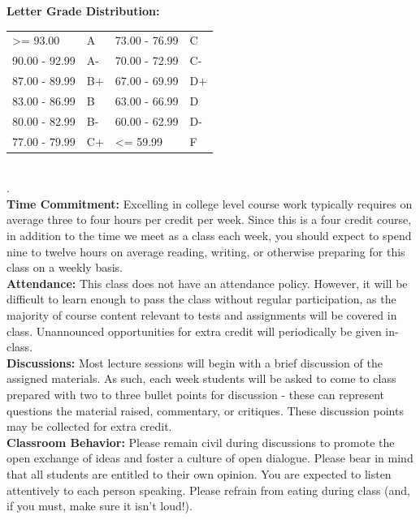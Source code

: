 \documentclass[11pt]{article}
\begin{document}
\textbf {\large Letter Grade Distribution:} \\
\hspace*{40mm}
\begin{tabular}{ l l | l l }
\textgreater= 93.00 & A & 73.00 - 76.99 & C \\
90.00 - 92.99 & A-  & 70.00 - 72.99 & C- \\
87.00 - 89.99 & B+  & 67.00 - 69.99 & D+ \\
83.00 - 86.99 & B  & 63.00 - 66.99 & D \\
80.00 - 82.99 & B-  & 60.00 - 62.99 & D- \\
77.00 - 79.99 & C+  & \textless= 59.99 & F \\
\end{tabular} \\
.\\
\textbf {\large Time Commitment:} Excelling in college level course work typically requires on average three to four hours per credit per week.  Since this is a four credit course, in addition to the time we meet as a class each week, you should expect to spend nine to twelve hours on average reading, writing, or otherwise preparing for this class on a weekly basis.\\

\textbf {\large Attendance:} This class does not have an attendance policy.  However, it will be difficult to learn enough to pass the class without regular participation, as the majority of course content relevant to tests and assignments will be covered in class.  Unannounced opportunities for extra credit will periodically be given in-class.\\

\textbf {\large Discussions:} Most lecture sessions will begin with a brief discussion of the assigned materials.  As such, each week students will be asked to come to class prepared with two to three bullet points for discussion - these can represent questions the material raised, commentary, or critiques.  These discussion points may be collected for extra credit.\\

\textbf {\large Classroom Behavior:} Please remain civil during discussions to promote the open exchange of ideas and foster a culture of open dialogue.  Please bear in mind that all students are entitled to their own opinion.  You are expected to listen attentively to each person speaking.  Please refrain from eating during class (and, if you must, make sure it isn't loud!).\\
\end{document}
